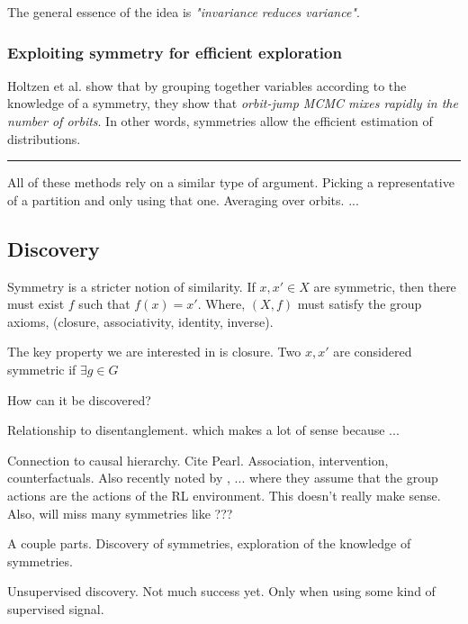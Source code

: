 The general essence of the idea is \textit{"invariance reduces variance"}. \cite{Chen2019}

\subsubsection{Exploiting symmetry for efficient exploration}

Holtzen et al. \cite{Holtzen2019} show that by grouping together variables according to
the knowledge of a symmetry, they show that \textit{orbit-jump MCMC mixes rapidly in the number of orbits}.
In other words, symmetries allow the efficient estimation of distributions.

\begin{center}\rule{0.5\linewidth}{\linethickness}\end{center}

All of these methods rely on a similar type of argument. Picking a representative
of a partition and only using that one. Averaging over orbits. ...

\subsection{Discovery}


Symmetry is a stricter notion of similarity.
If $x, x' \in X$ are symmetric, then there must exist $f$ such that $f(x) = x'$.
Where, $(X, f)$ must satisfy the group axioms, (closure, associativity, identity, inverse).

The key property we are interested in is closure.
Two $x, x'$ are considered symmetric if $\exists g\in G$


How can it be discovered?

Relationship to disentanglement. \cite{Higgins2018} which makes a lot of sense because ...

Connection to causal hierarchy. Cite Pearl. Association, intervention, counterfactuals.
Also recently noted by \cite{Caselles-Dupre2019}, ... where they assume that
the group actions are the actions of the RL environment.
This doesn't really make sense. Also, will miss many symmetries like ???

A couple parts. Discovery of symmetries, exploration of the knowledge of symmetries.

Unsupervised discovery. Not much success yet. Only when using some kind of supervised signal.

